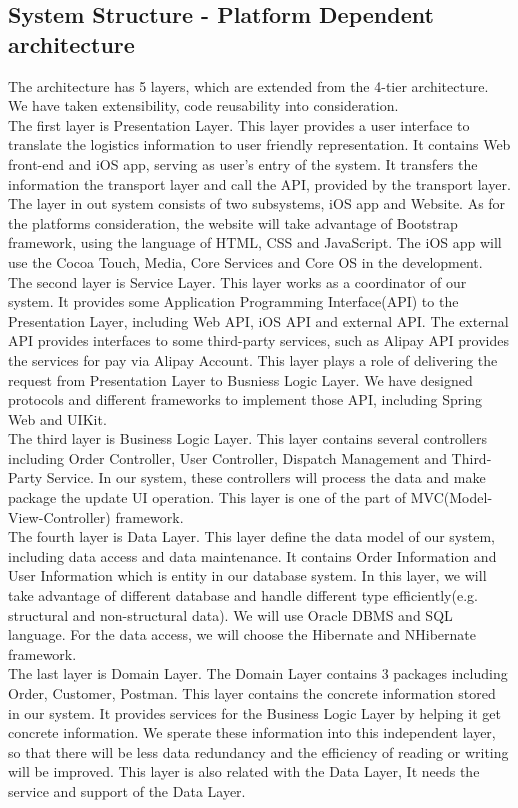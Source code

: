 \documentclass[12pt]{scrreprt}
\begin{document}
\subsection{System Structure - Platform Dependent architecture}
The architecture has 5 layers, which are extended from the 4-tier architecture.
We have taken extensibility, code reusability into consideration.\\
The first layer is Presentation Layer. This layer provides a user interface to
translate the logistics information to user friendly representation. It contains
Web front-end and iOS app, serving as user's entry of the system. It transfers
the information the transport layer and call the API, provided by the transport
layer. The layer in out system consists of two subsystems, iOS app and Website.
As for the platforms consideration, the website will take advantage of Bootstrap
framework, using the language of HTML, CSS and JavaScript. The iOS app will use
the Cocoa Touch, Media, Core Services and Core OS in the development.\\
The second layer is Service Layer. This layer works as a coordinator of our
system. It provides some Application Programming Interface(API) to the
Presentation Layer, including Web API, iOS API and external API. The external
API provides interfaces to some third-party services, such as Alipay API
provides the services for pay via Alipay Account. This layer plays a role
of delivering the request from Presentation Layer to Busniess Logic Layer.
We have designed protocols and different frameworks to implement those API,
including Spring Web and UIKit.\\
The third layer is Business Logic Layer. This layer contains several
controllers including Order Controller, User Controller, Dispatch Management and
Third-Party Service. In our system, these controllers will process the data and
make package the update UI operation. This layer is one of the part of
MVC(Model-View-Controller) framework.\\
The fourth layer is Data Layer. This layer define the data model of our system,
including data access and data maintenance. It contains Order Information and
User Information which is entity in our database system. In this layer, we will
take advantage of different database and handle different type efficiently(e.g.
structural and non-structural data). We will use Oracle DBMS and SQL language.
For the data access, we will choose the Hibernate and NHibernate framework.\\
The last layer is Domain Layer. The Domain Layer contains 3 packages including
Order, Customer, Postman. This layer contains the concrete information stored
in our system. It provides services for the Business Logic Layer by helping it
get concrete information. We sperate these information into this independent
layer, so that there will be less data redundancy and the efficiency of reading
or writing will be improved. This layer is also related with the Data Layer, It
needs the service and support of the Data Layer.
\end{document}

